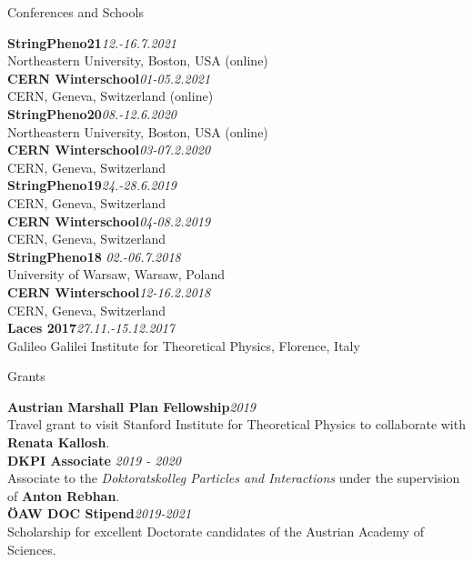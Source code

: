 \documentclass[a4paper]{resume} %
\begin{document}
\begin{rSection}{Conferences and Schools}

{\bf StringPheno21}\hfill {\em 12.-16.7.2021}
\\ Northeastern University, Boston, USA (online)\vspace{7pt}
\\{\bf CERN Winterschool}\hfill {\em 01-05.2.2021}
\\CERN, Geneva, Switzerland (online)\vspace{7pt}
\\{\bf StringPheno20}\hfill {\em 08.-12.6.2020}
\\ Northeastern University, Boston, USA (online)\vspace{7pt}
\\{\bf CERN Winterschool}\hfill {\em 03-07.2.2020}
\\CERN, Geneva, Switzerland\vspace{7pt}
\\{\bf StringPheno19}\hfill {\em 24.-28.6.2019}
\\ CERN, Geneva, Switzerland\vspace{7pt}
\\{\bf CERN Winterschool}\hfill {\em 04-08.2.2019}
\\CERN, Geneva, Switzerland\vspace{7pt}
\\{\bf StringPheno18} \hfill {\em 02.-06.7.2018}
\\University of Warsaw, Warsaw, Poland\vspace{7pt}
\\{\bf CERN Winterschool}\hfill{\em 12-16.2.2018}
\\CERN, Geneva, Switzerland \vspace{7pt}
\\{\bf Laces 2017}\hfill{\em 27.11.-15.12.2017}
\\Galileo Galilei Institute for Theoretical Physics, Florence, Italy

\end{rSection}

\newpage
\begin{rSection}{Grants}

{\bf Austrian Marshall Plan Fellowship}\hfill {\em 2019}
\\ Travel grant to visit Stanford Institute for Theoretical Physics to collaborate with {\bf Renata Kallosh}.\vspace{7pt}
\\ {\bf DKPI Associate} \hfill {\em 2019 - 2020}
\\ Associate to the \emph{Doktoratskolleg Particles and Interactions} under the supervision of \textbf{Anton Rebhan}.\vspace{7pt}
\\ {\bf ÖAW DOC Stipend}\hfill {\em 2019-2021}
\\ Scholarship for excellent Doctorate candidates of the Austrian Academy of Sciences.

\end{rSection}
\end{document}
